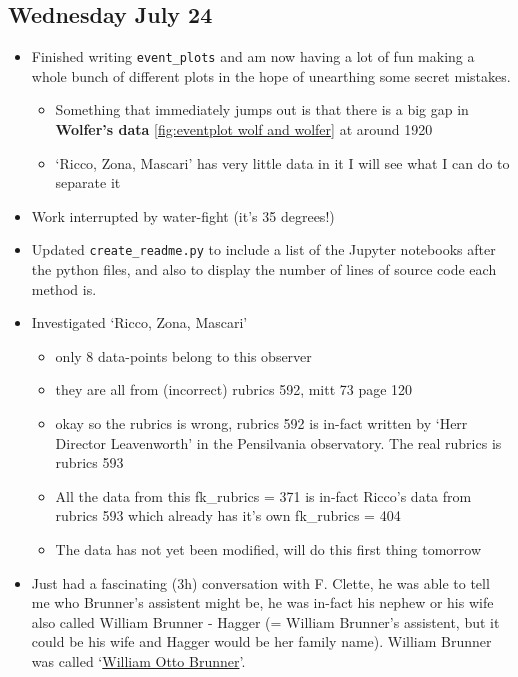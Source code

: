 \documentclass[12pt]{article}
\begin{document}
\subsection{Wednesday July 24}
\begin{itemize}
    \item Finished writing \texttt{event\_plots} and am now having a lot of fun making a whole bunch of different plots in the hope of unearthing some secret mistakes. 
    \begin{itemize}
        \item Something that immediately jumps out is that there is a big gap in \textbf{Wolfer's data} \ref{fig:eventplot wolf and wolfer} at around 1920
        \item `Ricco, Zona, Mascari' has very little data in it I will see what I can do to separate it
    \end{itemize}
    \item Work interrupted by water-fight (it's 35 degrees!)
    \item Updated \texttt{create\_readme.py} to include a list of the Jupyter notebooks after the python files, and also to display the number of lines of source code each method is.
    \item Investigated `Ricco, Zona, Mascari'
    \begin{itemize}
        \item only 8 data-points belong to this observer
        \item they are all from (incorrect) rubrics 592, mitt 73 page 120
        \item okay so the rubrics is wrong, rubrics 592 is in-fact written by `Herr Director Leavenworth' in the Pensilvania observatory. The real rubrics is rubrics 593
        \item All the data from this fk\_rubrics = 371 is in-fact Ricco's data from rubrics 593 which already has it's own fk\_rubrics = 404
        \item The data has not yet been modified, will do this first thing tomorrow 
    \end{itemize}
    \item Just had a fascinating (3h) conversation with F. Clette, he was able to tell me who Brunner's assistent might be, he was in-fact his nephew or his wife also called William Brunner - Hagger (= William Brunner's assistent, but it could be his wife and Hagger would be her family name). William Brunner was called `\href{https://en.wikipedia.org/wiki/William_Otto_Brunner}{William Otto Brunner}'. 

\end{itemize}
\end{document}
